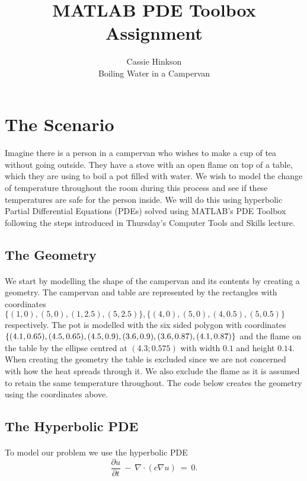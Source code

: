 \documentclass[12pt]{article}  %
\title{MATLAB PDE Toolbox Assignment}
\author{Cassie Hinkson\\
Boiling Water in a Campervan}
\begin{document}
\maketitle

\section{The Scenario}\label{s:intro}
%
\paragraph{} Imagine there is a person in a campervan who wishes to make a cup of tea without going outside. They have a stove with an open flame on top of a table, which they are using to boil a pot filled with water. We wish to model the change of temperature throughout the room during this process and see if these temperatures are safe for the person inside. We will do this using hyperbolic Partial Differential Equations (PDEs) solved using MATLAB's PDE Toolbox following the steps introduced in Thursday's Computer Tools and Skills lecture. 

\subsection{The Geometry}
\paragraph{} We start by modelling the shape of the campervan and its contents by creating a geometry. The campervan and table are represented by the rectangles with coordinates $\{(1,0), (5,0), (1,2.5), (5,2.5)\}, \{(4,0), (5,0), (4,0.5), (5,0.5)\}$  respectively. The pot is modelled with the six sided polygon with coordinates $\{(4.1,0.65),(4.5,0.65),\\(4.5,0.9),(3.6,0.9),(3.6,0.87),(4.1,0.87)\}$ and the flame on the table by the ellipse centred at $(4.3;0.575)$ with width $0.1$ and height $0.14$. When creating the geometry the table is excluded since we are not concerned with how the heat spreads through it. We also exclude the flame as it is assumed to retain the same temperature throughout. The code below creates the geometry using the coordinates above.


\subsection{The Hyperbolic PDE}\label{ss:eqn}
\paragraph{} To model our problem we use the hyperbolic PDE 
\begin{equation*}
	\frac{\partial u}{\partial t} \ - \ \nabla \cdot \left( c\nabla u\right) \ = \ 0.
\end{equation*}
\end{document}

